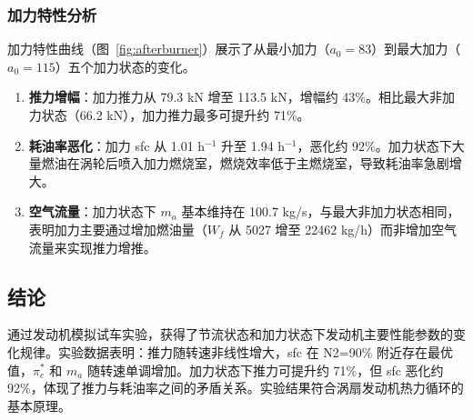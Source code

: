 \subsubsection{加力特性分析}

加力特性曲线（图~\ref{fig:afterburner}）展示了从最小加力（$a_0=83$）到最大加力（$a_0=115$）五个加力状态的变化。

\begin{enumerate}
    \item \textbf{推力增幅}：加力推力从 79.3 kN 增至 113.5 kN，增幅约 43\%。相比最大非加力状态（66.2 kN），加力推力最多可提升约 71\%。
    \item \textbf{耗油率恶化}：加力 sfc 从 1.01 h$^{-1}$ 升至 1.94 h$^{-1}$，恶化约 92\%。加力状态下大量燃油在涡轮后喷入加力燃烧室，燃烧效率低于主燃烧室，导致耗油率急剧增大。
    \item \textbf{空气流量}：加力状态下 $m_a$ 基本维持在 100.7 kg/s，与最大非加力状态相同，表明加力主要通过增加燃油量（$W_f$ 从 5027 增至 22462 kg/h）而非增加空气流量来实现推力增推。
\end{enumerate}


\subsection{结论}

通过发动机模拟试车实验，获得了节流状态和加力状态下发动机主要性能参数的变化规律。实验数据表明：推力随转速非线性增大，sfc 在 N2=90\% 附近存在最优值，$\pi_c^*$ 和 $m_a$ 随转速单调增加。加力状态下推力可提升约 71\%，但 sfc 恶化约 92\%，体现了推力与耗油率之间的矛盾关系。实验结果符合涡扇发动机热力循环的基本原理。
